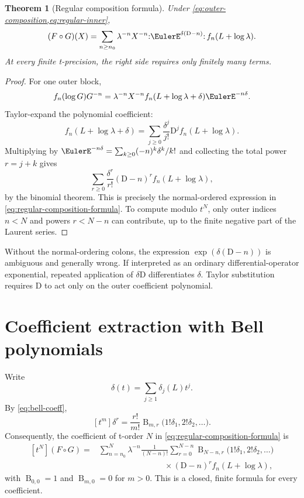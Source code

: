 \documentclass[11pt,openany]{book}
\theoremstyle{definition}
\theoremstyle{plain}
\newtheorem{theorem}{Theorem}[chapter]
\theoremstyle{remark}
\newcommand{\Bell}{\operatorname{B}}
\newcommand{\Dop}{\mathrm{D}}
\newcommand{\compose}{\mathbin{\circ}}
\begin{document}
\begin{theorem}[Regular composition formula]\label{thm:regular-composition}
Under \cref{eq:outer-composition,eq:regular-inner},
\begin{equation}\label{eq:regular-composition-formula}
 (F\compose G)(X)
 =\sum_{n\ge n_0}\lambda^{-n}X^{-n}
 \mathopen{:}\EulerE^{\delta(\Dop-n)}\mathclose{:}\,
 f_n(L+\log\lambda).
\end{equation}
At every finite t-precision, the right side requires only finitely many terms.
\end{theorem}
\begin{proof}
For one outer block,
\[
 f_n(\log G)G^{-n}
 =\lambda^{-n}X^{-n}
 f_n(L+\log\lambda+\delta)\EulerE^{-n\delta}.
\]
Taylor-expand the polynomial coefficient:
\[
 f_n(L+\log\lambda+\delta)
 =\sum_{j\ge0}\frac{\delta^j}{j!}\Dop^j
 f_n(L+\log\lambda).
\]
Multiplying by
\(\EulerE^{-n\delta}=\sum_{k\ge0}(-n)^k\delta^k/k!\) and collecting the total
power \(r=j+k\) gives
\[
 \sum_{r\ge0}\frac{\delta^r}{r!}(\Dop-n)^r
 f_n(L+\log\lambda),
\]
by the binomial theorem.  This is precisely the normal-ordered expression in
\cref{eq:regular-composition-formula}.  To compute modulo \(t^N\), only outer
indices \(n<N\) and powers \(r<N-n\) can contribute, up to the finite negative
part of the Laurent series.
\end{proof}

\begin{warningbox}
Without the normal-ordering colons, the expression
\(\exp(\delta(\Dop-n))\) is ambiguous and generally wrong.  If interpreted as
an ordinary differential-operator exponential, repeated application of
\(\delta\Dop\) differentiates \(\delta\).  Taylor substitution requires
\(\Dop\) to act only on the outer coefficient polynomial.
\end{warningbox}

\section{Coefficient extraction with Bell polynomials}
Write
\[
 \delta(t)=\sum_{j\ge1}\delta_j(L)t^j.
\]
By \cref{eq:bell-coeff},
\[
 [t^m]\delta^r
 =\frac{r!}{m!}\Bell_{m,r}
 \bigl(1!\delta_1,2!\delta_2,\ldots\bigr).
\]
Consequently, the coefficient of t-order \(N\) in
\cref{eq:regular-composition-formula} is
\begin{equation}\label{eq:composition-bell}
\begin{split}
 [t^N](F\compose G)
 ={}&\sum_{n=n_0}^{N}\lambda^{-n}
 \frac1{(N-n)!}
 \sum_{r=0}^{N-n}
 \Bell_{N-n,r}
 \bigl(1!\delta_1,2!\delta_2,\ldots\bigr)\\
 &\hspace{8em}\times
 (\Dop-n)^r f_n(L+\log\lambda),
\end{split}
\end{equation}
with \(\Bell_{0,0}=1\) and \(\Bell_{m,0}=0\) for \(m>0\).  This is a closed,
finite formula for every coefficient.
\end{document}
